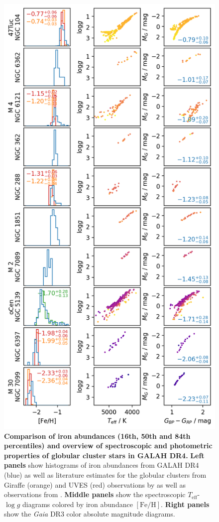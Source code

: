 \documentclass[
  journal=pasa,
  manuscript=research-paper, %
  year=2023,
  volume=37
]{cup-journal}
\newcommand{\Teff}{$T_\mathrm{eff}$\xspace}
\newcommand{\logg}{$\log g$\xspace}
\newcommand{\feh}{$\mathrm{[Fe/H]}$\xspace}
\newcommand{\Gaia}{\textit{Gaia}\xspace}
\begin{document}
\begin{figure}
 \centering
 \includegraphics[width=\textwidth]{figures/galah_dr4_allstar_globular_cluster_feh_comparison.png}
 \caption{\textbf{Comparison of iron abundances (16th, 50th and 84th percentiles) and overview of spectroscopic and photometric properties of globular cluster stars in GALAH DR4.}
 \textbf{Left panels} show histograms of iron abundances from GALAH DR4 (blue) as well as literature estimates for the globular clusters from Giraffe (orange) and UVES (red) observations by \citep{Carretta2009, Carretta2009c} as well as observations from \cite{Johnson2010}.
 \textbf{Middle panels} show the spectroscopic \Teff-\logg diagrams colored by iron abundance \feh.
 \textbf{Right panels} show the \Gaia DR3 color absolute magnitude diagrams.
}
 \label{fig:galah_dr4_allstar_globular_cluster_feh_comparison}
\end{figure}
\end{document}
